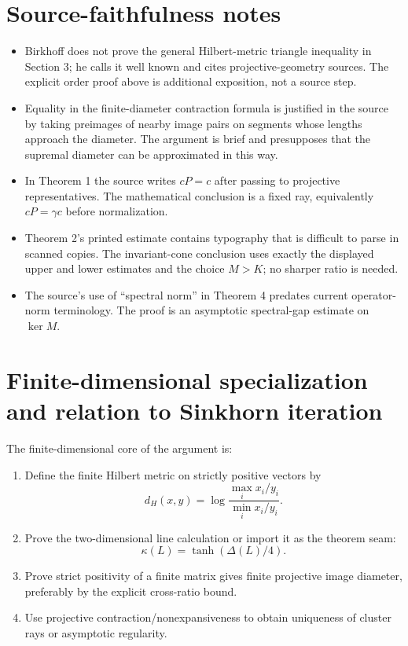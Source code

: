 \documentclass[11pt]{article}
\begin{document}
\section{Source-faithfulness notes}
\begin{itemize}[leftmargin=2em]
\item Birkhoff does not prove the general Hilbert-metric triangle inequality in Section 3; he calls
it well known and cites projective-geometry sources.  The explicit order proof above is additional
exposition, not a source step.
\item Equality in the finite-diameter contraction formula is justified in the source by taking
preimages of nearby image pairs on segments whose lengths approach the diameter.  The argument is
brief and presupposes that the supremal diameter can be approximated in this way.
\item In Theorem 1 the source writes $cP=c$ after passing to projective representatives.  The
mathematical conclusion is a fixed ray, equivalently $cP=\gamma c$ before normalization.
\item Theorem 2's printed estimate contains typography that is difficult to parse in scanned copies.
The invariant-cone conclusion uses exactly the displayed upper and lower estimates and the choice
$M>K$; no sharper ratio is needed.
\item The source's use of ``spectral norm'' in Theorem 4 predates current operator-norm terminology.
The proof is an asymptotic spectral-gap estimate on $\ker M$.
\end{itemize}

\section{Finite-dimensional specialization and relation to Sinkhorn iteration}
The finite-dimensional core of the argument is:
\begin{enumerate}[leftmargin=2em]
\item Define the finite Hilbert metric on strictly positive vectors by
\[
  d_H(x,y)=\log\frac{\max_i x_i/y_i}{\min_i x_i/y_i}.
\]
\item Prove the two-dimensional line calculation or import it as the theorem seam:
\[
  \kappa(L)=\tanh(\Delta(L)/4).
\]
\item Prove strict positivity of a finite matrix gives finite projective image diameter, preferably by the explicit cross-ratio bound.
\item Use projective contraction/nonexpansiveness to obtain uniqueness of cluster rays or asymptotic regularity.
\end{enumerate}
\end{document}
